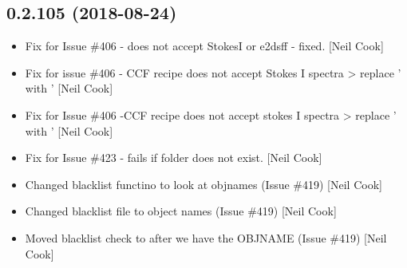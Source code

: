 \documentclass[a4paper,10pt,english]{report}
\begin{document}
\subsection{0.2.105 (2018-08-24)}
\label{\detokenize{misc/changelog:id354}}\begin{itemize}
\item {} 
Fix for Issue \#406 -  does not accept StokesI or e2dsff -
fixed. {[}Neil Cook{]}

\item {} 
Fix for issue \#406 - CCF recipe does not accept Stokes I spectra \textendash{}\textgreater{}
replace ’ with ’ {[}Neil Cook{]}

\item {} 
Fix for Issue \#406 -CCF recipe does not accept stokes I spectra \textendash{}\textgreater{}
replace ’ with ’ {[}Neil Cook{]}

\item {} 
Fix for Issue \#423 -  fails if folder does not exist. {[}Neil
Cook{]}

\item {} 
Changed blacklist functino to look at objnames (Issue \#419) {[}Neil
Cook{]}

\item {} 
Changed blacklist file to object names (Issue \#419) {[}Neil Cook{]}

\item {} 
Moved blacklist check to after we have the OBJNAME (Issue \#419) {[}Neil
Cook{]}

\end{itemize}
\end{document}
